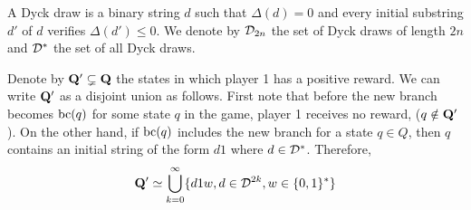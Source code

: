 \begin{mydef}
 A Dyck draw is a binary string $d$ such that $\Delta(d)=0$ and every initial substring $d'$ of $d$ verifies $\Delta(d')\leq 0$. We denote by $\mathcal{D}_{2n}$ the set of Dyck draws of length $2n$ and $\mathcal{D}^\ast$ the set of all Dyck draws.
\end{mydef}

Denote by $\mathbf{Q}'\subsetneq \mathbf{Q}$ the states in which player 1 has a positive reward. We can write $\mathbf{Q}'$ as a disjoint union as follows. First note that before the new branch becomes $\text{bc}(q)$ for some state $q$ in the game, player 1 receives no reward, (\ie $q\notin \mathbf{Q}'$). On the other hand, if $\text{bc}(q)$ includes the new branch for a state $q\in Q$, then $q$ contains an initial string of the form $d1$ where $d\in \mathcal{D}^\ast$. Therefore,
$$\mathbf{Q}'\simeq \bigcup_{k=0}^\infty \{d1w,d\in \mathcal{D}^{2k},w\in \{0,1\}^\ast\}$$

